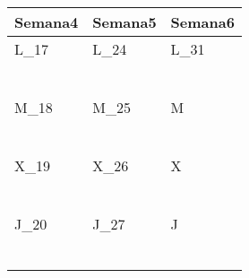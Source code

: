 	\renewcommand{\arraystretch}{1.24}\scriptsize
	\begin{longtabu} to \textwidth { X[l] X[l] X[l]}
		\centering \textbf{Semana4} &  \centering\textbf{Semana5}  &   \centering\textbf{Semana6}  \\
		\toprule
		L_{17} & L_{24} & L_{31} \\
		\makebox{$\square$}\dotfill & \makebox{$\square$}\dotfill & \makebox{$\square$}\dotfill \\
		\dotfill & \dotfill & \dotfill \\
		\makebox{$\square$}\dotfill & \makebox{$\square$}\dotfill & \makebox{$\square$}\dotfill \\
		\dotfill & \dotfill & \dotfill \\
		\makebox{$\square$}\dotfill & \makebox{$\square$}\dotfill & \makebox{$\square$}\dotfill \\
		\dotfill & \dotfill & \dotfill \\

		\hline

		M_{18} & M_{25} & M \\
		\makebox{$\square$}\dotfill & \makebox{$\square$}\dotfill &   \\
		\dotfill & \dotfill &   \\
		\makebox{$\square$}\dotfill & \makebox{$\square$}\dotfill &   \\
		\dotfill & \dotfill &   \\
		\makebox{$\square$}\dotfill & \makebox{$\square$}\dotfill &   \\
		\dotfill & \dotfill &   \\

		\hline

		X_{19} & X_{26} & X \\
		\makebox{$\square$}\dotfill & \makebox{$\square$}\dotfill &   \\
		\dotfill & \dotfill &   \\
		\makebox{$\square$}\dotfill & \makebox{$\square$}\dotfill &   \\
		\dotfill & \dotfill &   \\
		\makebox{$\square$}\dotfill & \makebox{$\square$}\dotfill &   \\
		\dotfill & \dotfill &   \\

		\hline

		J_{20} & J_{27} & J \\
		\makebox{$\square$}\dotfill & \makebox{$\square$}\dotfill &   \\
		\dotfill & \dotfill &   \\
		\makebox{$\square$}\dotfill & \makebox{$\square$}\dotfill &   \\
		\dotfill & \dotfill &   \\
		\makebox{$\square$}\dotfill & \makebox{$\square$}\dotfill &   \\
		\dotfill & \dotfill &   \\


\end{longtabu}
